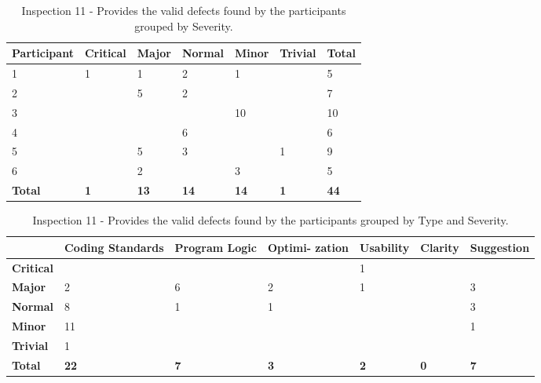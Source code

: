 \begin{table}[!h]
  \begin{center}
    \caption[Inspection 11 - Results by Severity]{Inspection 11
      - Provides the valid defects found by the participants grouped by
      Severity.}
    \label{tab:inspection-results-11}
    \begin{tabular}{|p{2.0cm}|p{1.5cm}|p{1.5cm}|p{1.5cm}|p{1.5cm}|p{1.5cm}|p{1.5cm}|} \hline
{\bf Participant} & {\bf Critical} & {\bf Major} 
& {\bf Normal} & {\bf Minor} & {\bf Trivial} & {\bf Total} \\ \hline
1 & 1 & 1 & 2 & 1 &   & 5 \\ \hline
2 &   & 5 & 2 &   &   & 7 \\ \hline
3 &   &   &   & 10&   & 10 \\ \hline
4 &   &   & 6 &   &   & 6 \\ \hline
5 &   & 5 & 3 &   & 1 & 9 \\ \hline
6 &   & 2 &   & 3 &   & 5 \\ \hline
{\bf Total} & {\bf 1} & {\bf 13} & {\bf 14} & {\bf 14} & {\bf 1} & {\bf 44} \\ \hline
    \end{tabular}
  \end{center}
\end{table}


\begin{table}[!h]
  \begin{center}
    \caption[Inspection 11 - Results by Type and Severity]{Inspection 11 -
      Provides the valid defects found by the participants grouped by Type
      and Severity.}
    \label{tab:inspection-results-11-type}
    \begin{tabular}{|p{2.0cm}|p{1.7cm}|p{1.5cm}|p{1.7cm}|p{1.4cm}|p{1.4cm}|p{1.5cm}|}  \hline   
\small{} & \small{}{\bf Coding Standards} & 
\small{}{\bf Program Logic} & \small{} {\bf Optimi- zation} & 
\small{}{\bf Usability} & \small{} {\bf Clarity} & 
\small{} {\bf Suggestion} \\ \hline

{\bf Critical} &   &   &   & 1 &   &   \\ \hline
{\bf Major}    & 2 & 6 & 2 & 1 &   & 3  \\ \hline
{\bf Normal}   & 8 & 1 & 1 &   &   & 3  \\ \hline
{\bf Minor}    & 11&   &   &   &   & 1  \\ \hline
{\bf Trivial}  & 1 &   &   &   &   &   \\ \hline

{\bf Total} & {\bf 22} & {\bf 7} & {\bf 3} & {\bf 2} & {\bf 0} & {\bf 7} \\ \hline

    \end{tabular}
  \end{center}
\end{table}



